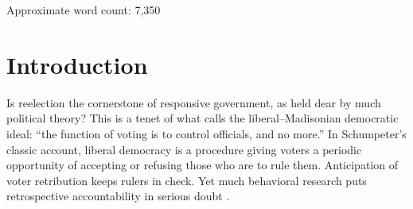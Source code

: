 \documentclass[letter,12pt]{article}
\begin{document}
\noindent Approximate word count: 7,350




\doublespacing

\section{Introduction}

Is reelection the cornerstone of responsive government, as held dear by much political theory? This is a tenet of what \citet[][:9]{riker.lib.pop.1978} calls the liberal--Madisonian democratic ideal: ``the function of voting is to control officials, and no more.'' In Schumpeter's \citeyearpar{schumpeter.1942} classic account, liberal democracy is a procedure giving voters a periodic opportunity of accepting or refusing those who are to rule them. Anticipation of voter retribution keeps rulers in check. Yet much behavioral research puts retrospective accountability in serious doubt \citep{achen.bartels.Dem.real.2016}.
\end{document}
